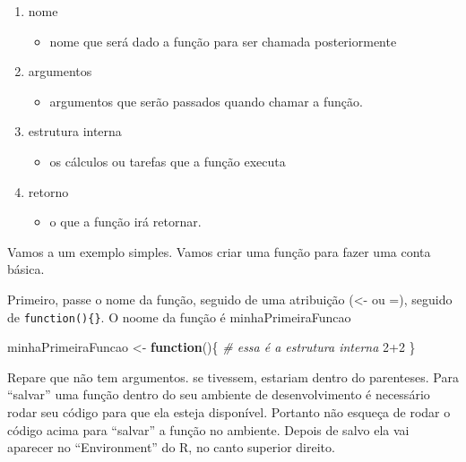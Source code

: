 \documentclass[
]{book}
\newenvironment{Shaded}{\begin{snugshade}}{\end{snugshade}}
\newcommand{\CommentTok}[1]{\textcolor[rgb]{0.56,0.35,0.01}{\textit{#1}}}
\newcommand{\ControlFlowTok}[1]{\textcolor[rgb]{0.13,0.29,0.53}{\textbf{#1}}}
\newcommand{\DecValTok}[1]{\textcolor[rgb]{0.00,0.00,0.81}{#1}}
\newcommand{\NormalTok}[1]{#1}
\newcommand{\OtherTok}[1]{\textcolor[rgb]{0.56,0.35,0.01}{#1}}
\newcommand{\SpecialCharTok}[1]{\textcolor[rgb]{0.00,0.00,0.00}{#1}}
\providecommand{\tightlist}{%
  \setlength{\itemsep}{0pt}\setlength{\parskip}{0pt}}
\begin{document}
\begin{enumerate}
\def\labelenumi{\arabic{enumi}.}
\tightlist
\item
  nome

  \begin{itemize}
  \tightlist
  \item
    nome que será dado a função para ser chamada posteriormente
  \end{itemize}
\item
  argumentos

  \begin{itemize}
  \tightlist
  \item
    argumentos que serão passados quando chamar a função.
  \end{itemize}
\item
  estrutura interna

  \begin{itemize}
  \tightlist
  \item
    os cálculos ou tarefas que a função executa
  \end{itemize}
\item
  retorno

  \begin{itemize}
  \tightlist
  \item
    o que a função irá retornar.
  \end{itemize}
\end{enumerate}

Vamos a um exemplo simples. Vamos criar uma função para fazer uma conta básica.

Primeiro, passe o nome da função, seguido de uma atribuição (\textless- ou =), seguido de \texttt{function()\{\}}. O noome da função é minhaPrimeiraFuncao

\begin{Shaded}
\begin{Highlighting}[]
\NormalTok{minhaPrimeiraFuncao }\OtherTok{\textless{}{-}} \ControlFlowTok{function}\NormalTok{()\{ }
  \CommentTok{\# essa é a estrutura interna}
  \DecValTok{2}\SpecialCharTok{+}\DecValTok{2}
\NormalTok{\}}
\end{Highlighting}
\end{Shaded}

Repare que não tem argumentos. se tivessem, estariam dentro do parenteses. Para ``salvar'' uma função dentro do seu ambiente de desenvolvimento é necessário rodar seu código para que ela esteja disponível. Portanto não esqueça de rodar o código acima para ``salvar'' a função no ambiente. Depois de salvo ela vai aparecer no ``Environment'' do R, no canto superior direito.
\end{document}
